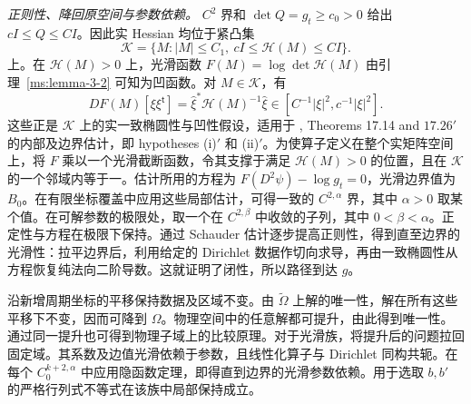 \emph{正则性、降回原空间与参数依赖。} $C^2$ 界和 $\det Q=g_t\ge c_0>0$ 给出 $cI\le Q\le CI$。因此实 Hessian 均位于紧凸集
\[
 \mathcal K=\{M:|M|\le C_1,\ cI\le\mathcal H(M)\le CI\}.
\]
上。在 $\mathcal H(M)>0$ 上，光滑函数 $F(M)=\log\det\mathcal H(M)$ 由引理~\ref{ms:lemma-3-2} 可知为凹函数。对 $M\in\mathcal K$，有
\[
 DF(M)[\xi\xi^{\mathsf t}]=
 \widehat\xi^*\mathcal H(M)^{-1}\widehat\xi
 \in[C^{-1}|\xi|^2,c^{-1}|\xi|^2].
\]
这些正是 $\mathcal K$ 上的实一致椭圆性与凹性假设，适用于 \cite{r-31}, Theorems 17.14 and $17.26'$ 的内部及边界估计，即 hypotheses (i)$'$ 和 (ii)$'$。为使算子定义在整个实矩阵空间上，将 $F$ 乘以一个光滑截断函数，令其支撑于满足 $\mathcal H(M)>0$ 的位置，且在 $\mathcal K$ 的一个邻域内等于一。估计所用的方程为 $F(D^2\psi)-\log g_t=0$，光滑边界值为 $B_0$。在有限坐标覆盖中应用这些局部估计，可得一致的 $C^{2,\alpha}$ 界，其中 $\alpha>0$ 取某个值。在可解参数的极限处，取一个在 $C^{2,\beta}$ 中收敛的子列，其中 $0<\beta<\alpha$。正定性与方程在极限下保持。通过 Schauder 估计逐步提高正则性，得到直至边界的光滑性：拉平边界后，利用给定的 Dirichlet 数据作切向求导，再由一致椭圆性从方程恢复纯法向二阶导数。这就证明了闭性，所以路径到达 $g$。

沿新增周期坐标的平移保持数据及区域不变。由 $\widetilde\Omega$ 上解的唯一性，解在所有这些平移下不变，因而可降到 $\Omega$。物理空间中的任意解都可提升，由此得到唯一性。通过同一提升也可得到物理子域上的比较原理。对于光滑族，将提升后的问题拉回固定域。其系数及边值光滑依赖于参数，且线性化算子与 Dirichlet 同构共轭。在每个 $C_0^{k+2,\alpha}$ 中应用隐函数定理，即得直到边界的光滑参数依赖。用于选取 $b,b'$ 的严格行列式不等式在该族中局部保持成立。
